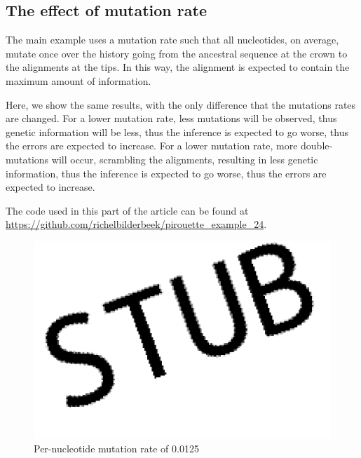 \subsection{The effect of mutation rate}
\label{subsec:mutation_rate}


The main example uses a mutation rate such that all nucleotides,
on average, mutate once over the history going from the
ancestral sequence at the crown to the alignments at the tips.
In this way, the alignment is expected to contain the maximum
amount of information.

Here, we show the same results, with the only difference that
the mutations rates are changed.
For a lower mutation rate, less mutations will be observed, thus
genetic information will be less, thus the inference is expected
to go worse, thus the errors are expected to increase.
For a lower mutation rate, more double-mutations will occur,
scrambling the alignments, resulting in less genetic information, 
thus the inference is expected to go worse, 
thus the errors are expected to increase.

The code used in this part of the article can be found at 
\url{https://github.com/richelbilderbeek/pirouette_example_24}.

\begin{figure}[H]
  \includegraphics[width=\textwidth]{pirouette_example_24/example_24/314/errors.png}
  \caption{Per-nucleotide mutation rate of 0.0125}
\end{figure}


